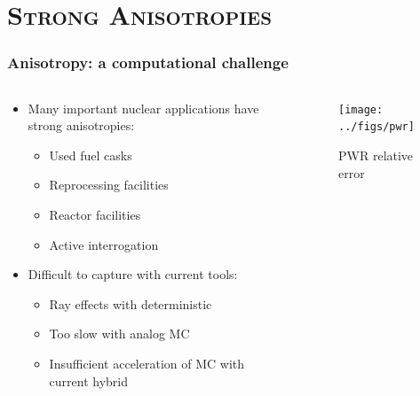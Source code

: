 \documentclass[xcolor=x11names,compress]{beamer}
\renewcommand{\(}{\begin{columns}}
\renewcommand{\)}{\end{columns}}
\newcommand{\<}[1]{\begin{column}{#1}}
\renewcommand{\>}{\end{column}}
\begin{document}
\section{\scshape Strong Anisotropies}
\begin{frame}[fragile]
  \frametitle{Anisotropy: a computational challenge}

	\begin{columns}
  	\begin{column}{0.5\textwidth}
	\begin{itemize}
	\item Many important nuclear applications have strong anisotropies:
	 \begin{itemize}
	 \item Used fuel casks
	 \item Reprocessing facilities
	 \item Reactor facilities
	 \item Active interrogation 
	 \end{itemize}
	\pause
	\item Difficult to capture with current tools:
	 \begin{itemize}
	 \item Ray effects with deterministic
	 \item Too slow with analog MC
	 \item Insufficient acceleration of MC with current hybrid
	 \end{itemize}
	\end{itemize}
  	\end{column}
 	\begin{column}{0.5\textwidth}
 	 \begin{center}
 	 \begin{figure}
 	 \texttt{[image: ../figs/pwr]}  
 	 \caption{PWR relative error \cite{Pantelias2013}}
 	 \end{figure}
 	 \end{center}

  	\end{column}
	\end{columns}

\end{frame}
\end{document}
